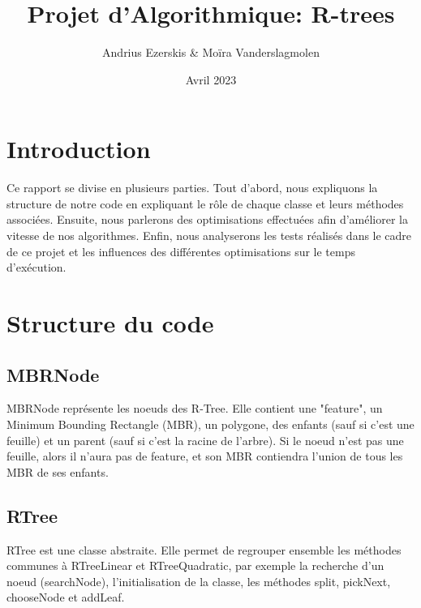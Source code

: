 \documentclass[utf8]{article}
\begin{document}
\begin{titlepage}


    \author{Andrius Ezerskis \& Moïra Vanderslagmolen}
    \title{Projet d'Algorithmique: R-trees}
    \date{Avril 2023}
    \maketitle
\end{titlepage}
\tableofcontents
\newpage
\begin{large}


    \section{Introduction}
    \indent
    \par
    Ce rapport se divise en plusieurs parties. Tout d'abord, nous expliquons la
    structure de notre code en expliquant le rôle de chaque classe et leurs
    méthodes associées. Ensuite, nous parlerons des optimisations effectuées afin
    d'améliorer la vitesse de nos algorithmes. Enfin, nous analyserons les tests
    réalisés dans le cadre de ce projet et les influences des différentes
    optimisations sur le temps d'exécution.
    \par
    \section{Structure du code}

    \par
    \subsection{MBRNode}
    \indent
    \par
    MBRNode représente les noeuds des R-Tree. Elle contient une "feature", un Minimum Bounding Rectangle (MBR), un polygone,
    des enfants (sauf si c'est une feuille) et un parent (sauf si c'est la racine de
    l'arbre). Si le noeud n'est pas une feuille, alors il n'aura pas de feature,
    et son MBR contiendra l'union de tous les MBR de ses enfants.
    \par

    \subsection{RTree}\label{RTree}
    \indent
    \par
    RTree est une classe abstraite. Elle permet de regrouper ensemble les méthodes
    communes à RTreeLinear et RTreeQuadratic, par exemple la recherche d'un noeud
    (searchNode), l'initialisation de la classe, les méthodes split, pickNext,
    chooseNode et addLeaf.
    \par


\end{large}
\end{document}
